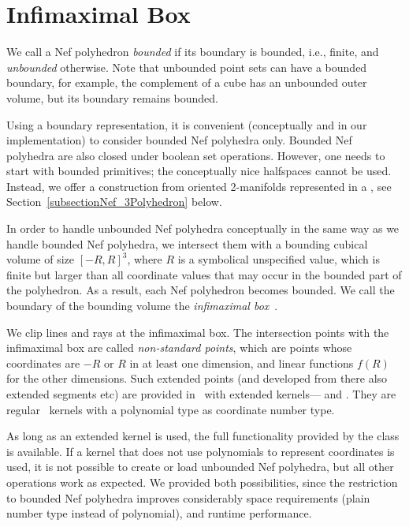 \section{Infimaximal Box}
\label{sectionNef_3InfiBox}

We call a Nef polyhedron \emph{bounded} if its boundary is bounded,
i.e., finite, and \emph{unbounded} otherwise. Note that unbounded
point sets can have a bounded boundary, for example, the complement of
a cube has an unbounded outer volume, but its boundary remains bounded.

Using a boundary representation, it is convenient (conceptually and in
our implementation) to consider bounded Nef polyhedra only.  Bounded
Nef polyhedra are also closed under boolean set operations. However, one
needs to start with bounded primitives; the conceptually nice
halfspaces cannot be used. Instead, we offer a construction from oriented
2-manifolds represented in a  , see
Section~\ref{subsectionNef_3Polyhedron} below.

In order to handle unbounded Nef polyhedra conceptually in the same
way as we handle bounded Nef polyhedra, we intersect them with a
bounding cubical volume of size $[-R,R]^3$, where $R$ is a symbolical
unspecified value, which is finite but larger than all coordinate
values that may occur in the bounded part of the polyhedron. As a
result, each Nef polyhedron becomes bounded.  We call the boundary of
the bounding volume the \emph{infimaximal
  box}~\cite{cgal:sm-iftml-00}.

We clip lines and rays at the infimaximal box. The intersection points
with the infimaximal box are called \emph{non-standard points}, which
are points whose coordinates are $-R$ or $R$ in at least one
dimension, and linear functions $f(R)$ for the other dimensions. Such
extended points (and developed from there also extended segments etc)
are provided in \cgal\ with extended
kernels--- and
.  They are regular \cgal\ kernels
with a polynomial type as coordinate number type.

As long as an extended kernel is used, the full functionality provided
by the  class is available. If a kernel that 
does not use polynomials to represent coordinates is used, it is not 
possible to create or load unbounded Nef
polyhedra, but all other operations work as expected. We provided both
possibilities, since the restriction to bounded Nef polyhedra improves
considerably space requirements (plain number type instead of
polynomial), and runtime performance.


